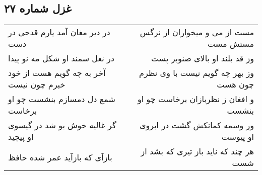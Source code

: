 \begin{center}
\section*{غزل شماره ۲۷}
\label{sec:sh027}
\begin{longtable}{l p{0.5cm} r}
در دیر مغان آمد یارم قدحی در دست
&&
مست از می و میخواران از نرگس مستش مست
\\
در نعل سمند او شکل مه نو پیدا
&&
وز قد بلند او بالای صنوبر پست
\\
آخر به چه گویم هست از خود خبرم چون نیست
&&
وز بهر چه گویم نیست با وی نظرم چون هست
\\
شمع دل دمسازم بنشست چو او برخاست
&&
و افغان ز نظربازان برخاست چو او بنشست
\\
گر غالیه خوش بو شد در گیسوی او پیچید
&&
ور وسمه کمانکش گشت در ابروی او پیوست
\\
بازآی که بازآید عمر شده حافظ
&&
هر چند که ناید باز تیری که بشد از شست
\\
\end{longtable}
\end{center}
